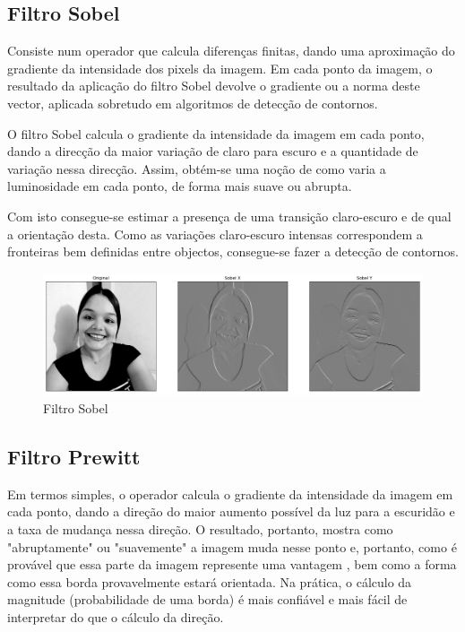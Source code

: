 		\lstset{language=c++}
		{\tiny }
	
	\subsection{Filtro Sobel}
		Consiste num operador que calcula diferenças finitas, dando uma aproximação do gradiente da intensidade dos pixels da imagem. Em cada ponto da imagem, o resultado da aplicação do filtro Sobel devolve o gradiente ou a norma deste vector, aplicada sobretudo em algoritmos de detecção de contornos.
		
		O filtro Sobel calcula o gradiente da intensidade da imagem em cada ponto, dando a direcção da maior variação de claro para escuro e a quantidade de variação nessa direcção. Assim, obtém-se uma noção de como varia a luminosidade em cada ponto, de forma mais suave ou abrupta.
		
		Com isto consegue-se estimar a presença de uma transição claro-escuro e de qual a orientação desta. Como as variações claro-escuro intensas correspondem a fronteiras bem definidas entre objectos, consegue-se fazer a detecção de contornos.
	
		\begin{figure}[!htb]
			\centering
			\includegraphics[width=\textwidth]{img/10-sobel.png}
			\caption{Filtro Sobel}
		\end{figure}
		
		\lstset{language=python}
		{\tiny }
	
	\subsection{Filtro Prewitt}
		Em termos simples, o operador calcula o gradiente da intensidade da imagem em cada ponto, dando a direção do maior aumento possível da luz para a escuridão e a taxa de mudança nessa direção. O resultado, portanto, mostra como "abruptamente" ou "suavemente" a imagem muda nesse ponto e, portanto, como é provável que essa parte da imagem represente uma vantagem , bem como a forma como essa borda provavelmente estará orientada. Na prática, o cálculo da magnitude (probabilidade de uma borda) é mais confiável e mais fácil de interpretar do que o cálculo da direção.
	
